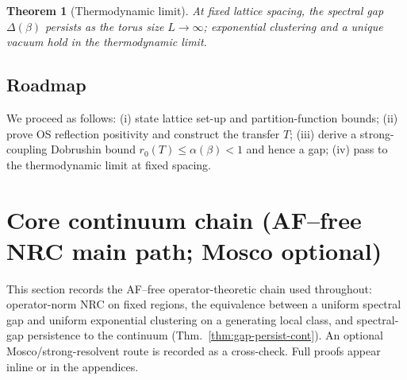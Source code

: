 \documentclass[11pt]{amsart}
\theoremstyle{plain}
\newtheorem{theorem}{Theorem}[section]
\theoremstyle{definition}
\theoremstyle{remark}
\begin{document}
\begin{theorem}[Thermodynamic limit] \label{thm:thermo}
At fixed lattice spacing, the spectral gap $\Delta(\beta)$ persists as the torus size $L\to\infty$; exponential clustering and a unique vacuum hold in the thermodynamic limit.
\end{theorem}

\subsection{Roadmap}

We proceed as follows: (i) state lattice set-up and partition-function bounds; (ii) prove OS reflection positivity and construct the transfer $T$; (iii) derive a strong-coupling Dobrushin bound $r_0(T)\le \alpha(\beta)<1$ and hence a gap; (iv) pass to the thermodynamic limit at fixed spacing.

\bigskip
\noindent\begin{center}
\end{center}
\bigskip
\section{Core continuum chain (AF--free NRC main path; Mosco optional)}
This section records the AF--free operator-theoretic chain used throughout: operator-norm NRC on fixed regions, the equivalence between a uniform spectral gap and uniform exponential clustering on a generating local class, and spectral-gap persistence to the continuum (Thm.~\ref{thm:gap-persist-cont}). An optional Mosco/strong-resolvent route is recorded as a cross-check. Full proofs appear inline or in the appendices.
\end{document}
